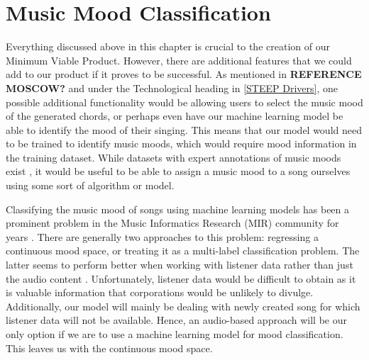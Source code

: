 \section{Music Mood Classification}
\label{Music Mood Classification}
Everything discussed above in this chapter is crucial to the creation of our Minimum Viable Product. However, there are additional features that we could add to our product if it proves to be successful. As mentioned in \textbf{REFERENCE MOSCOW?} and under the Technological heading in \cref{STEEP Drivers}, one possible additional functionality would be allowing users to select the music mood of the generated chords, or perhaps even have our machine learning model be able to identify the mood of their singing. This means that our model would need to be trained to identify music moods, which would require mood information in the training dataset. While datasets with expert annotations of music moods exist \cite{allmusic}, it would be useful to be able to assign a music mood to a song ourselves using some sort of algorithm or model.



Classifying the music mood of songs using machine learning models has been a prominent problem in the Music Informatics Research (MIR) community for years \cite{MIRMood}. There are generally two approaches to this problem: regressing a continuous mood space, or treating it as a multi-label classification problem. The latter seems to perform better when working with listener data rather than just the audio content \cite{ListeningData}. Unfortunately, listener data would be difficult to obtain as it is valuable information that corporations would be unlikely to divulge. Additionally, our model will mainly be dealing with newly created song for which listener data will not be available. Hence, an audio-based approach will be our only option if we are to use a machine learning model for mood classification. This leaves us with the continuous mood space.


